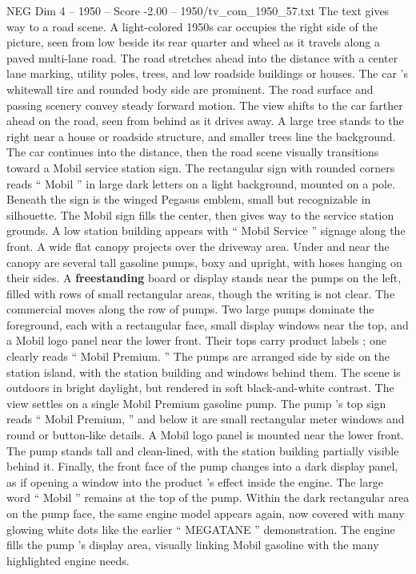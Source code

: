\begin{textsample}{NEG Dim 4 – 1950 – Score -2.00 – 1950/tv\_com\_1950\_57.txt}
The text gives way to a road scene.
A light-colored 1950s car occupies the right side of the picture, seen from low beside its rear quarter and wheel as it travels along a paved multi-lane road.
The road stretches ahead into the distance with a center lane marking, utility poles, trees, and low roadside buildings or houses.
The car ’s whitewall tire and rounded body side are prominent.
The road surface and passing scenery convey steady forward motion.
The view shifts to the car farther ahead on the road, seen from behind as it drives away.
A large tree stands to the right near a house or roadside structure, and smaller trees line the background.
The car continues into the distance, then the road scene visually transitions toward a Mobil service station sign.
The rectangular sign with rounded corners reads “ Mobil ” in large dark letters on a light background, mounted on a pole.
Beneath the sign is the winged Pegasus emblem, small but recognizable in silhouette.
The Mobil sign fills the center, then gives way to the service station grounds.
A low station building appears with “ Mobil Service ” signage along the front.
A wide flat canopy projects over the driveway area.
Under and near the canopy are several tall gasoline pumps, boxy and upright, with hoses hanging on their sides.
A \textbf{freestanding} board or display stands near the pumps on the left, filled with rows of small rectangular areas, though the writing is not clear.
The commercial moves along the row of pumps.
Two large pumps dominate the foreground, each with a rectangular face, small display windows near the top, and a Mobil logo panel near the lower front.
Their tops carry product labels ; one clearly reads “ Mobil Premium. ” The pumps are arranged side by side on the station island, with the station building and windows behind them.
The scene is outdoors in bright daylight, but rendered in soft black-and-white contrast.
The view settles on a single Mobil Premium gasoline pump.
The pump ’s top sign reads “ Mobil Premium, ” and below it are small rectangular meter windows and round or button-like details.
A Mobil logo panel is mounted near the lower front.
The pump stands tall and clean-lined, with the station building partially visible behind it.
Finally, the front face of the pump changes into a dark display panel, as if opening a window into the product ’s effect inside the engine.
The large word “ Mobil ” remains at the top of the pump.
Within the dark rectangular area on the pump face, the same engine model appears again, now covered with many glowing white dots like the earlier “ MEGATANE ” demonstration.
The engine fills the pump ’s display area, visually linking Mobil gasoline with the many highlighted engine needs.

\end{textsample}
